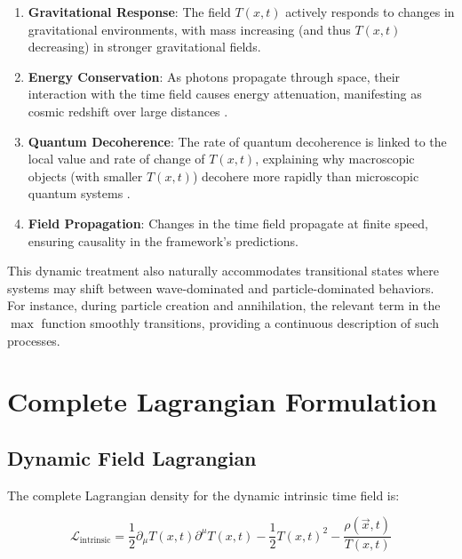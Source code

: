\documentclass[12pt,a4paper]{article}
\newcommand{\Tfieldt}{T(x,t)}
\newcommand{\vecx}{\vec{x}}
\begin{document}
	\begin{enumerate}
		\item \textbf{Gravitational Response}: The field $\Tfieldt$ actively responds to changes in gravitational environments, with mass increasing (and thus $\Tfieldt$ decreasing) in stronger gravitational fields.
		
		\item \textbf{Energy Conservation}: As photons propagate through space, their interaction with the time field causes energy attenuation, manifesting as cosmic redshift over large distances \cite{pascher_galaxies_2025}.
		
		\item \textbf{Quantum Decoherence}: The rate of quantum decoherence is linked to the local value and rate of change of $\Tfieldt$, explaining why macroscopic objects (with smaller $\Tfieldt$) decohere more rapidly than microscopic quantum systems \cite{pascher_quantum_2025}.
		
		\item \textbf{Field Propagation}: Changes in the time field propagate at finite speed, ensuring causality in the framework's predictions.
	\end{enumerate}
	
	This dynamic treatment also naturally accommodates transitional states where systems may shift between wave-dominated and particle-dominated behaviors. For instance, during particle creation and annihilation, the relevant term in the $\max$ function smoothly transitions, providing a continuous description of such processes.
	
	\section{Complete Lagrangian Formulation}
	\label{sec:lagrangian_formulation}
	
	\subsection{Dynamic Field Lagrangian}
	\label{subsec:dynamic_lagrangian}
	
	The complete Lagrangian density for the dynamic intrinsic time field is:
	
	\begin{equation}
		\mathcal{L}_{\text{intrinsic}} = \frac{1}{2}\partial_{\mu}\Tfieldt\partial^{\mu}\Tfieldt - \frac{1}{2}\Tfieldt^2 - \frac{\rho(\vecx,t)}{\Tfieldt}
		\label{eq:intrinsic_lagrangian}
	\end{equation}
	
\end{document}
